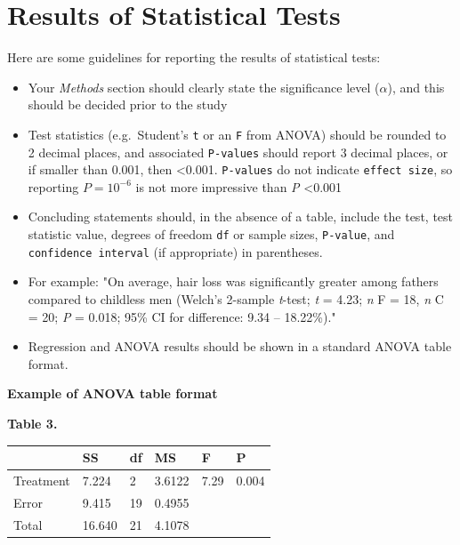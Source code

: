 \documentclass[
]{book}
\newcounter{none} %
\begin{document}
\section{Results of Statistical Tests}\label{results-of-statistical-tests}

Here are some guidelines for reporting the results of statistical tests:

\begin{itemize}
\item
  Your \emph{Methods} section should clearly state the significance level (\(\alpha\)), and this should be decided prior to the study
\item
  Test statistics (e.g.~Student's \texttt{t} or an \texttt{F} from ANOVA) should be rounded to 2 decimal places, and associated \texttt{P-values} should report 3 decimal places, or if smaller than 0.001, then \textless0.001. \texttt{P-values} do not indicate \texttt{effect\ size}, so reporting \(P = 10^{-6}\) is not more impressive than \emph{P} \textless0.001
\item
  Concluding statements should, in the absence of a table, include the test, test statistic value, degrees of freedom \texttt{df} or sample sizes, \texttt{P-value}, and \texttt{confidence\ interval} (if appropriate) in parentheses.
\item
  For example: "On average, hair loss was significantly greater among fathers compared to childless men (Welch's 2-sample \emph{t}-test; \emph{t} = 4.23; \emph{n} F = 18, \emph{n} C = 20; \emph{P} = 0.018; 95\% CI for difference: 9.34 -- 18.22\%)."\\
\item
  Regression and ANOVA results should be shown in a standard ANOVA table format.
\end{itemize}

\textbf{Example of ANOVA table format}

\textbf{Table 3.}

{\def\LTcaptype{none} %
\begin{longtable}[]{@{}llllll@{}}
\toprule\noalign{}
& SS & df & MS & F & P \\
\midrule\noalign{}
\endhead
\bottomrule\noalign{}
\endlastfoot
Treatment & 7.224 & 2 & 3.6122 & 7.29 & 0.004 \\
Error & 9.415 & 19 & 0.4955 & & \\
Total & 16.640 & 21 & 4.1078 & & \\
\end{longtable}
}
\end{document}
